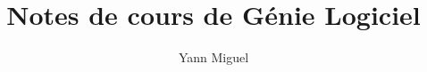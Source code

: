 \documentclass[12pt, a4paper]{article}
\title{Notes de cours de Génie Logiciel}
\author{Yann Miguel}
\begin{document}
\ttfamily
\maketitle
\tableofcontents
\newpage








\end{document}
